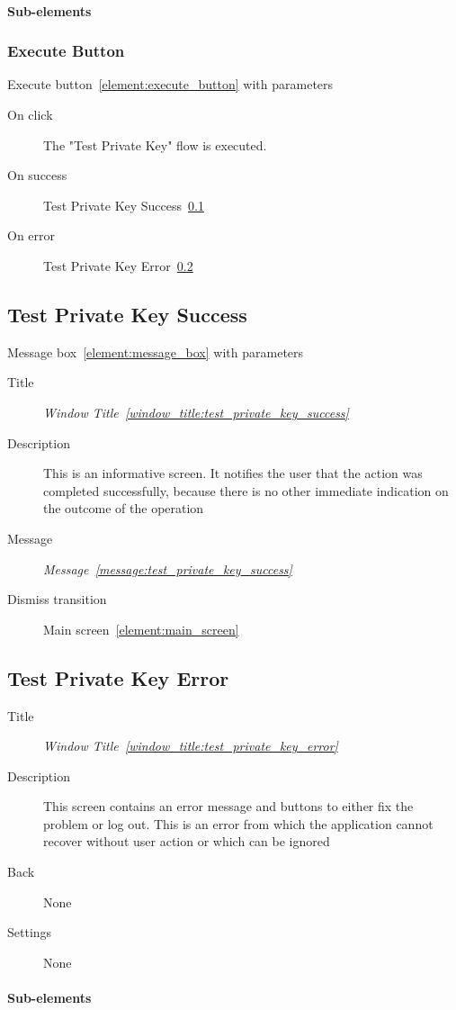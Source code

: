 \documentclass[a4paper,10pt]{article}
\newcommand{\windowTitleLabelText}{Window Title}
\newcommand{\windowTitleLabel}{window_title:}
\DeclareRobustCommand{\windowTitleRef}[1]{%
   \emph{\windowTitleLabelText~\ref{\windowTitleLabel#1}}}
\newcommand{\messageLabelText}{Message}
\newcommand{\messageLabel}{message:}
\DeclareRobustCommand{\messageTextRef}[1]{%
   \emph{\messageLabelText~\ref{\messageLabel#1}}}
\newcommand{\elementLabel}{element:}
\DeclareRobustCommand{\element}[2]{\subsection{#1}\label{\elementLabel#2}}
\DeclareRobustCommand{\elementRef}[1]{\ref{\elementLabel#1}}
\begin{document}
\paragraph{Sub-elements}

\subsubsection{Execute Button}
Execute button~\elementRef{execute_button} with parameters
\begin{description}
 \item[On click] The "Test Private Key" flow is executed.
 \item[On success] Test Private Key 
Success~\elementRef{test_private_key_success}
 \item[On error] Test Private Key Error~\elementRef{test_private_key_error}
\end{description}

\element{Test Private Key Success}{test_private_key_success}
Message box~\elementRef{message_box} with parameters
\begin{description}
 \item[Title] \windowTitleRef{test_private_key_success}
 \item[Description] This is an informative screen. It notifies the user that 
the action was completed successfully, because there is no other immediate 
indication on the outcome of the operation
 \item[Message] \messageTextRef{test_private_key_success}
 \item[Dismiss transition] Main screen~\elementRef{main_screen}
\end{description}

\element{Test Private Key Error}{test_private_key_error}

\begin{description}
 \item[Title] \windowTitleRef{test_private_key_error}
 \item[Description] This screen contains an error message and buttons to either 
fix the problem or log out. This is an error from which the application cannot 
recover without user action or which can be ignored
 \item[Back] None
 \item[Settings] None
\end{description}

\paragraph{Sub-elements}
\end{document}
